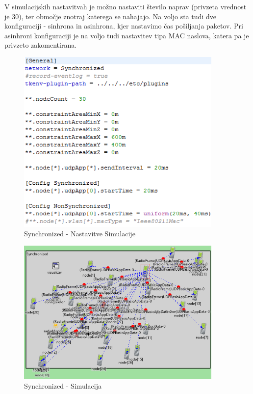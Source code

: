 \documentclass[11pt,a4paper,slovene]{myarticle}
\begin{document}
V simulacijskih nastavitvah je možno nastaviti število naprav (privzeta vrednost je 30), ter območje znotraj katerega se nahajajo. Na voljo sta tudi dve konfiguraciji - sinhrona in asinhrona, kjer nastavimo čas pošiljanja paketov. Pri asinhroni konfiguraciji je na voljo tudi nastavitev tipa MAC naslova, katera pa je privzeto zakomentirana.
\begin{figure}[h!]
	\centering
		\includegraphics[width=0.9\textwidth, keepaspectratio=true]{./images/syn-settings.png}
	\caption{Synchronized - Nastavitve Simulacije}
	\label{fig:synchronizednastavitvesimulacije}
\end{figure}
\begin{figure}[h!]
	\centering
		\includegraphics[width=0.9\textwidth, keepaspectratio=true]{./images/syn-simulation.png}
	\caption{Synchronized - Simulacija}
	\label{fig:synchronizedsimulacija}
\end{figure}
\end{document}
